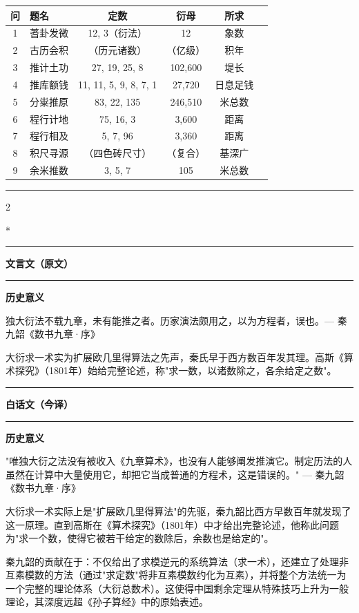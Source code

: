 \documentclass[11pt,a4paper]{article}
\newcommand{\zhtext}[1]{{\chinese #1}}
\newcommand{\leftcolheader}{%
  \noindent\textcolor{leftheader}{\rule{\columnwidth}{1.5pt}}\par
  \vspace{2pt}
  \noindent\textbf{\color{leftheader}\chinese 文言文（原文）}\par
  \vspace{2pt}
  \noindent\textcolor{leftheader}{\rule{\columnwidth}{0.6pt}}\par
  \vspace{4pt}
}
\newcommand{\rightcolheader}{%
  \noindent\textcolor{rightheader}{\rule{\columnwidth}{1.5pt}}\par
  \vspace{2pt}
  \noindent\textbf{\color{rightheader}\chinese 白话文（今译）}\par
  \vspace{2pt}
  \noindent\textcolor{rightheader}{\rule{\columnwidth}{0.6pt}}\par
  \vspace{4pt}
}
\begin{document}
\begin{center}
\small
\begin{tabular}{clcccc}
\toprule
\textbf{问} & \textbf{题名} & \textbf{定数} & \textbf{衍母} & \textbf{所求} \\
\midrule
1 & 蓍卦发微 & 12, 3（衍法） & 12 & 象数 \\
2 & 古历会积 & （历元诸数） & （亿级） & 积年 \\
3 & 推计土功 & 27, 19, 25, 8 & 102,600 & 堤长 \\
4 & 推库额钱 & 11, 11, 5, 9, 8, 7, 1 & 27,720 & 日息足钱 \\
5 & 分粜推原 & 83, 22, 135 & 246,510 & 米总数 \\
6 & 程行计地 & 75, 16, 3 & 3,600 & 距离 \\
7 & 程行相及 & 5, 7, 96 & 3,360 & 距离 \\
8 & 积尺寻源 & （四色砖尺寸） & （复合） & 基深广 \\
9 & 余米推数 & 3, 5, 7 & 105 & 米总数 \\
\bottomrule
\end{tabular}
\end{center}

\vspace{0.5em}
\noindent\textcolor{rulecolor}{\rule{\textwidth}{0.4pt}}

\begin{paracol}{2}

\switchcolumn[0]*\leftcolheader

\small
\textbf{\zhtext{历史意义}}

独大衍法不载九章，未有能推之者。历家演法颇用之，以为方程者，误也。--- 秦九韶《数书九章·序》

大衍求一术实为扩展欧几里得算法之先声，秦氏早于西方数百年发其理。高斯《算术探究》（1801年）始给完整论述，称"求一数，以诸数除之，各余给定之数"。

\switchcolumn\rightcolheader

\small\color{prefacecolor}
\textbf{历史意义}

"唯独大衍之法没有被收入《九章算术》，也没有人能够阐发推演它。制定历法的人虽然在计算中大量使用它，却把它当成普通的方程术，这是错误的。" --- 秦九韶《数书九章·序》

大衍求一术实际上是"扩展欧几里得算法"的先驱，秦九韶比西方早数百年就发现了这一原理。直到高斯在《算术探究》（1801年）中才给出完整论述，他称此问题为"求一个数，使得它被若干给定的数除后，余数也是给定的"。

秦九韶的贡献在于：不仅给出了求模逆元的系统算法（求一术），还建立了处理非互素模数的方法（通过"求定数"将非互素模数约化为互素），并将整个方法统一为一个完整的理论体系（大衍总数术）。这使得中国剩余定理从特殊技巧上升为一般理论，其深度远超《孙子算经》中的原始表述。

\end{paracol}
\end{document}
